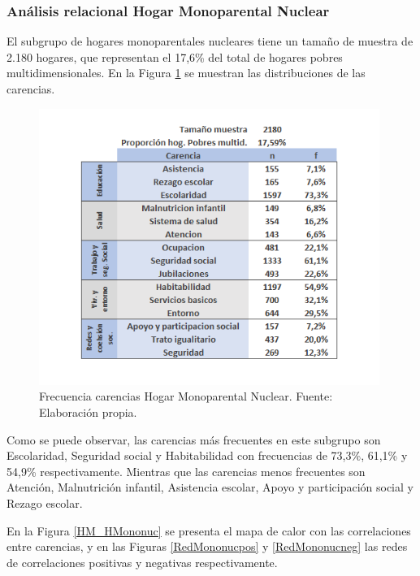 \documentclass[12pt,letterpaper,spanish]{article}
\begin{document}
\subsubsection{Análisis relacional Hogar Monoparental Nuclear}
El subgrupo de hogares monoparentales nucleares tiene un tamaño de muestra de 2.180 hogares, que representan el 17,6\% del total de hogares pobres multidimensionales. En la Figura \ref{freHMononuc} se muestran las distribuciones de las carencias.
\begin{figure}[H]
  \centering
    \includegraphics[height=9cm]{HOGARES/tabla_mononuc.png}
    \caption{Frecuencia carencias Hogar Monoparental Nuclear. Fuente: Elaboración propia.}
    \label{freHMononuc}
\end{figure}
Como se puede observar, las carencias más frecuentes en este subgrupo son Escolaridad, Seguridad social y Habitabilidad con frecuencias de 73,3\%, 61,1\% y 54,9\% respectivamente. Mientras que las carencias menos frecuentes son Atención, Malnutrición infantil, Asistencia escolar, Apoyo y participación social y Rezago escolar.

En la Figura \ref{HM_HMononuc} se presenta el mapa de calor con las correlaciones entre carencias, y en las Figuras \ref{RedMononucpos} y \ref{RedMononucneg} las redes de correlaciones positivas y negativas respectivamente.
\end{document}
